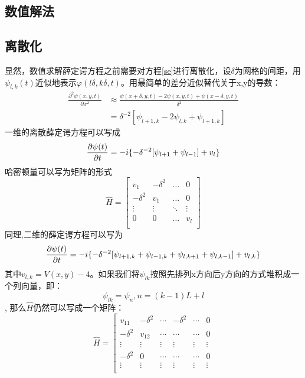 \begin{multicols}{2}
\section{数值解法}
\subsection{离散化}
显然，数值求解薛定谔方程之前需要对方程\ref{se}进行离散化，设$\delta$为网格的间距，用$\psi_{l,k}(t)$近似地表示$\varphi(l\delta,k\delta,t)$。用最简单的差分近似替代关于x,y的导数：
\begin{align}
    \frac{\partial^2\psi(x,y,t)}{\partial x^2}&\approx \frac{\psi(x+\delta,y,t)-2\psi(x,y,t)+\psi(x-\delta,y,t)}{\delta^2}\\
    &=\delta^{-2}[\psi_{l+1,k}-2\psi_{l,k}+\psi_{l+1,k}]
\end{align}
一维的离散薛定谔方程可以写成
\begin{align*}
    \pdv{\psi(t)}{t}=-i\{-\delta^{-2}[\psi_{l+1}+\psi_{l-1}]+v_{l}\}
\end{align*}
哈密顿量可以写为矩阵的形式
\[ \hat{H} = \left[
\begin{array}{cccc}
v_1 & -\delta^2 & \ldots & 0\\
-\delta^2  & v_1 & \ldots & 0\\
\vdots & \vdots & \ddots & \vdots\\
0 & 0 & \ldots & v_l\\
\end{array} \right] \]
同理,二维的薛定谔方程可以写为\\
\begin{align}
    \pdv{\psi(t)}{t}=-i\{-\delta^{-2}[\psi_{l+1,k}+\psi_{l-1,k}+\psi_{l,k+1}+\psi_{l,k-1}]+v_{l,k}\}
    \label{2d}
\end{align}
其中$v_{l,k}=V(x,y)-4$。如果我们将$\psi_{lk}$按照先排列x方向后y方向的方式堆积成一个列向量，即：
\begin{equation}
    \psi_{lk}=\psi_{n},n=(k-1)L+l
\end{equation},
那么$\hat{H}$仍然可以写成一个矩阵：
\[ \hat{H} = \left[
\begin{array}{cccccc}
v_{11} & -\delta^2  & \cdots &-\delta^2  &\cdots & 0\\
-\delta^2  & v_{12} & \cdots& \cdots & \cdots & 0\\
\vdots & \vdots & \vdots & \vdots& \vdots& \vdots \\
-\delta^2 &0& \cdots &\cdots & \cdots& 0\\
\vdots &\vdots &\vdots & \vdots &  \vdots & \vdots \\

\end{array}\]
\end{multicols}
